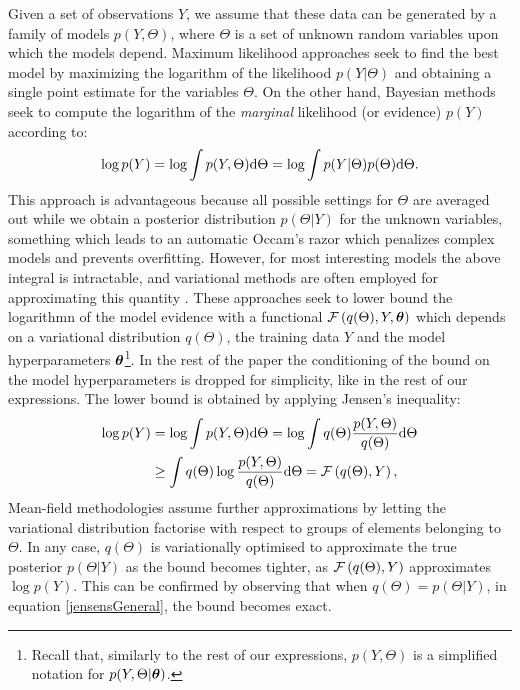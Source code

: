 Given a set of observations $Y$, we assume that these data can be generated by a family of models
$p(Y, \Theta)$, where $\Theta$ is a set of unknown random variables upon which the models depend.
Maximum likelihood approaches seek to find the best model by maximizing the logarithm of the likelihood
$p(Y|\Theta)$ and obtaining a single point estimate for the variables $\Theta$. On the other hand,
Bayesian methods seek to compute the logarithm of the \emph{marginal} likelihood (or evidence) $p(Y)$ according to:
$$
\log p(Y) = \log \int p(Y, \Theta) \text{d} \Theta  = \log \int p(Y | \Theta) p(\Theta) \text{d} \Theta.
$$
This approach is advantageous because all possible settings for $\Theta$ are averaged out
while we obtain a posterior distribution $p(\Theta | Y)$ for the unknown variables,
something which leads to an automatic Occam's razor which penalizes complex models
and prevents overfitting.
However, for most interesting models the above integral is intractable, and variational
methods are often employed for approximating this quantity \citep{bishop}. These approaches seek to
lower bound the logarithmn of the model evidence with a functional $\mathcal{F}\left(q(\Theta), Y, \boldsymbol \theta \right)$
which depends on a variational distribution $q(\Theta)$, the training data $Y$ and the model hyperparameters
$\boldsymbol \theta$\footnote{Recall that, similarly to the rest of our expressions, $p(Y,\Theta)$ is a
simplified notation for $p(Y,\Theta | \boldsymbol \theta)$.}. In the rest of the paper the conditioning of the bound 
on the model hyperparameters is dropped for simplicity, like in the rest of our expressions.
The lower bound is obtained
 by applying Jensen's inequality:
\begin{align}
\log p(Y) &= \log \int p(Y, \Theta) \text{d} \Theta
               = \log \int q(\Theta) \frac{p(Y, \Theta)}{q(\Theta)} \text{d} \Theta \nonumber \\
               & \geq \int q(\Theta) \log \frac{p(Y, \Theta)}{q(\Theta)} \text{d} \Theta
                  = \mathcal{F} \left( q(\Theta),Y \right) \label{jensensGeneral} ,
\end{align}
Mean-field methodologies assume further approximations by letting
the variational distribution factorise with respect to groups of elements
belonging to $\Theta$. 
In any case, $q(\Theta)$ is variationally optimised to approximate the true
posterior $p(\Theta | Y)$ as the bound becomes tighter, \ie as $\mathcal{F} \left(q(\Theta),Y \right)$
approximates $\log p(Y)$. This can be confirmed by observing that
when $q(\Theta) = p(\Theta | Y)$, in equation \eqref{jensensGeneral},
the bound becomes exact.

